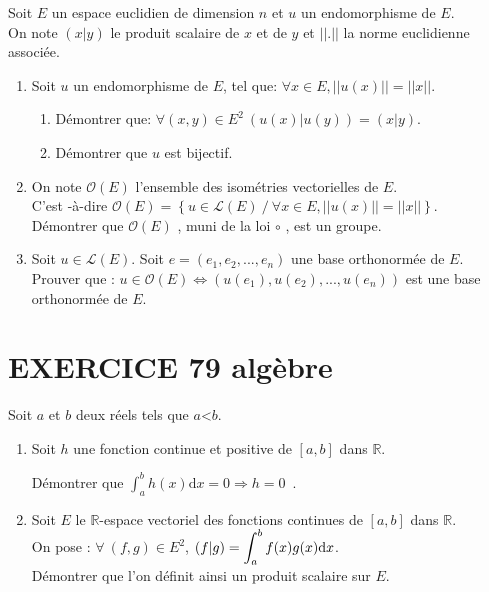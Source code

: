 \documentclass[10pt,oneside]{article}
\begin{document}
\begin{flushleft}
Soit $E$ un espace euclidien de dimension $n$ et $u$ un endomorphisme de $E$.\\ On note $\left( x|y\right) $ le produit scalaire de $x$ et de $y$ et $||.||$ la norme euclidienne associée.

\begin{enumerate}
\item Soit $u$ un endomorphisme de $E$, tel que: $\forall x \in E, \vert\vert u(x)\vert\vert = \vert\vert x\vert\vert$. 
	\begin{enumerate}
	\item Démontrer que: $\forall (x,y)\in E^{2}~(u(x)|u(y)) = (x|y) $.
	\item Démontrer que $u$ est bijectif.
	\end{enumerate}
\item
On note ${\mathcal{O}}(E)$ l'ensemble des isométries vectorielles de $E$.\\
C'est -à-dire  ${\mathcal{O}}(E)=\left\lbrace u\in\mathcal{L}\left(E \right)\:/ \: \forall x \in E, \vert\vert u(x)\vert\vert = \vert\vert x\vert\vert \right\rbrace $.\\
\medskip
Démontrer que ${\mathcal{O}}(E)$ , muni de la loi $\circ $ , est un groupe.\\
\item
Soit $u\in\mathcal{L}(E)$. Soit $e=(e_1,e_2,...,e_n)$ une base orthonormée de $E$.\\
Prouver que : $u\in {\mathcal{O}}(E)\Longleftrightarrow$$ \left( u(e_1),u(e_2),...,u(e_n)\right) $ est une base orthonormée de $E$.
\end{enumerate}


\section*{EXERCICE 79 \: algèbre}

Soit $a$ et $b$ deux réels tels que $a$<$b$.\\
\begin{enumerate}
\item Soit $h$ une fonction continue et positive de $[a,b]$ dans $\mathbb{R}$.\bigskip

Démontrer que  $\displaystyle\int_{a}^{b}h(x)\text{d}x=0\Longrightarrow h=0$~.

\item Soit $E$ le $\mathbb{R}$-espace vectoriel des fonctions continues de $[a,b]$ dans $\mathbb{R}$.\\
  On pose : $\forall\:(f,g)\in E^2$, $\left( f|g\right) =\displaystyle\displaystyle\int_{a}^{b}f(x)g(x)\text{d}x$.\\
   Démontrer que l'on d\'{e}finit ainsi un produit scalaire sur $E$.


\end{enumerate}
\end{flushleft}
\end{document}
